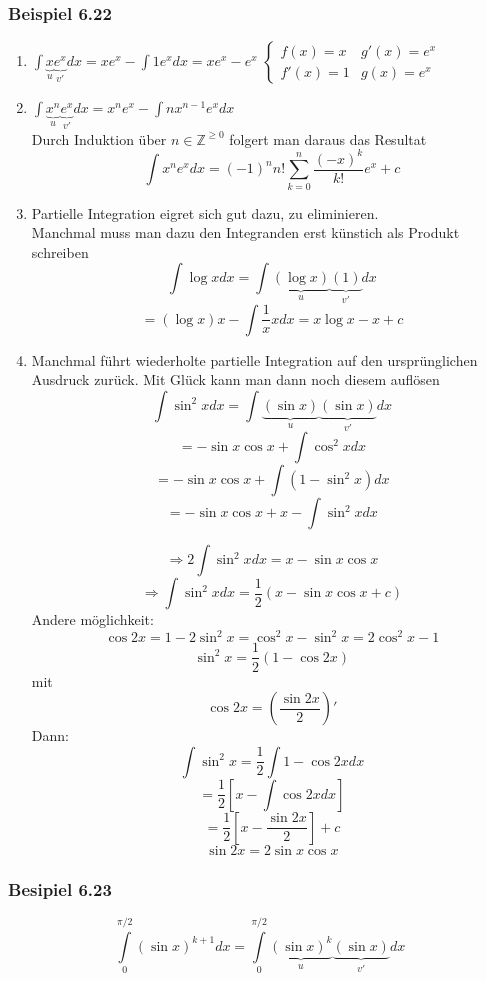 \subsubsection*{Beispiel 6.22}
\begin{enumerate}
\item $\int {\underbrace x_u\underbrace {{e^x}}_{v'}dx = x{e^x} - \int {1{e^x}dx} } =x e^x - e^x$
$\left\{\begin{array}{cc} f(x)=x & g'(x)=e^x \\ f'(x)=1 & g(x)=e^x\end{array}\right.$

\item $\int {\underbrace {{x^n}}_u\underbrace {{e^x}}_{v'}dx = {x^n}{e^x} - \int {n{x^{n - 1}}{e^x}dx} } $\\
Durch Induktion über $n\in\mathbb{Z}^{\geq 0}$ folgert man daraus das Resultat \[\int {{x^n}{e^x}dx = {{( - 1)}^n}n!\sum\limits_{k = 0}^n {\frac{{{{( - x)}^k}}}{{k!}}{e^x} + c} } \]

\item Partielle Integration eigret sich gut dazu,  zu eliminieren.\\
Manchmal muss man dazu den Integranden erst künstich als Produkt schreiben
\[\int {\log xdx = \int {\underbrace {(\log x)}_u\underbrace {(1)}_{v'}dx} } \]
\[ = (\log x)x - \int {\frac{1}{x}} xdx = x\log x - x + c\]

\item Manchmal führt wiederholte partielle Integration auf den ursprünglichen Ausdruck zurück. Mit Glück kann man dann noch diesem auflösen 
\[\int {{{\sin }^2}xdx = \int {\underbrace {(\sin x)}_u\underbrace {(\sin x)}_{v'}dx} } \]
$$ =  - \sin x\cos x + \int {{{\cos }^2}xdx}$$
$$ =  - \sin x\cos x + \int {(1 - {{\sin }^2}x)dx}$$
$$ =  - \sin x\cos x + x - \int {{{\sin }^2}xdx} $$

\[ \Rightarrow 2\int {{{\sin }^2}xdx = x - \sin x\cos x} \]
\[ \Rightarrow \int {{{\sin }^2}xdx = \frac{1}{2}\left( {x - \sin x\cos x} +c \right)} \]
Andere möglichkeit:
$$\cos 2x = 1-2\sin^2x=\cos^2x-\sin^2x=2\cos^2x-1$$
$$\sin^2x=\frac{1}{2}(1-\cos 2x)$$
mit $$\cos 2x=\left(\frac{\sin 2x}{2} \right)'$$
Dann: $$\int{\sin^2 x}=\frac{1}{2}\int{1-\cos 2x dx}$$
$$=\frac{1}{2}\left[ x-\int{\cos 2x dx}\right]$$
$$=\frac{1}{2}\left[ x-\frac{\sin 2x}{2}\right] +c$$
$$\sin 2x =2\sin x\cos x$$
\end{enumerate}

\subsubsection*{Besipiel 6.23}
\[\int\limits_0^{\pi /2} {{{(\sin x)}^{k + 1}}dx = \int\limits_0^{\pi /2} {\underbrace {{{(\sin x)}^k}}_u\underbrace {(\sin x)}_{v'}dx} } \]


